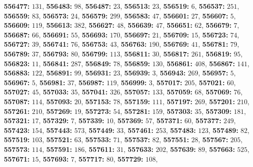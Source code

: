 \textsf{\bfseries 556477:} $131$, \textsf{\bfseries 556483:} $98$, \textsf{\bfseries 556487:} $23$, \textsf{\bfseries 556513:} $23$, \textsf{\bfseries 556519:} $6$, \textsf{\bfseries 556537:} $251$, \textsf{\bfseries 556559:} $83$, \textsf{\bfseries 556573:} $24$, \textsf{\bfseries 556579:} $299$, \textsf{\bfseries 556583:} $47$, \textsf{\bfseries 556601:} $27$, \textsf{\bfseries 556607:} $5$, \textsf{\bfseries 556609:} $119$, \textsf{\bfseries 556613:} $382$, \textsf{\bfseries 556627:} $48$, \textsf{\bfseries 556639:} $47$, \textsf{\bfseries 556651:} $62$, \textsf{\bfseries 556679:} $7$, \textsf{\bfseries 556687:} $66$, \textsf{\bfseries 556691:} $55$, \textsf{\bfseries 556693:} $170$, \textsf{\bfseries 556697:} $21$, \textsf{\bfseries 556709:} $15$, \textsf{\bfseries 556723:} $74$, \textsf{\bfseries 556727:} $39$, \textsf{\bfseries 556741:} $76$, \textsf{\bfseries 556753:} $43$, \textsf{\bfseries 556763:} $190$, \textsf{\bfseries 556769:} $41$, \textsf{\bfseries 556781:} $79$, \textsf{\bfseries 556789:} $37$, \textsf{\bfseries 556793:} $80$, \textsf{\bfseries 556799:} $113$, \textsf{\bfseries 556811:} $30$, \textsf{\bfseries 556817:} $261$, \textsf{\bfseries 556819:} $95$, \textsf{\bfseries 556823:} $11$, \textsf{\bfseries 556841:} $287$, \textsf{\bfseries 556849:} $78$, \textsf{\bfseries 556859:} $130$, \textsf{\bfseries 556861:} $408$, \textsf{\bfseries 556867:} $141$, \textsf{\bfseries 556883:} $122$, \textsf{\bfseries 556891:} $99$, \textsf{\bfseries 556931:} $23$, \textsf{\bfseries 556939:} $3$, \textsf{\bfseries 556943:} $269$, \textsf{\bfseries 556957:} $5$, \textsf{\bfseries 556967:} $5$, \textsf{\bfseries 556981:} $37$, \textsf{\bfseries 556987:} $119$, \textsf{\bfseries 556999:} $3$, \textsf{\bfseries 557017:} $205$, \textsf{\bfseries 557021:} $60$, \textsf{\bfseries 557027:} $45$, \textsf{\bfseries 557033:} $35$, \textsf{\bfseries 557041:} $326$, \textsf{\bfseries 557057:} $133$, \textsf{\bfseries 557059:} $68$, \textsf{\bfseries 557069:} $76$, \textsf{\bfseries 557087:} $114$, \textsf{\bfseries 557093:} $20$, \textsf{\bfseries 557153:} $78$, \textsf{\bfseries 557159:} $111$, \textsf{\bfseries 557197:} $269$, \textsf{\bfseries 557201:} $210$, \textsf{\bfseries 557261:} $210$, \textsf{\bfseries 557269:} $19$, \textsf{\bfseries 557273:} $54$, \textsf{\bfseries 557281:} $159$, \textsf{\bfseries 557303:} $35$, \textsf{\bfseries 557309:} $181$, \textsf{\bfseries 557321:} $17$, \textsf{\bfseries 557329:} $7$, \textsf{\bfseries 557339:} $10$, \textsf{\bfseries 557369:} $57$, \textsf{\bfseries 557371:} $60$, \textsf{\bfseries 557377:} $249$, \textsf{\bfseries 557423:} $154$, \textsf{\bfseries 557443:} $573$, \textsf{\bfseries 557449:} $33$, \textsf{\bfseries 557461:} $253$, \textsf{\bfseries 557483:} $123$, \textsf{\bfseries 557489:} $82$, \textsf{\bfseries 557519:} $103$, \textsf{\bfseries 557521:} $63$, \textsf{\bfseries 557533:} $71$, \textsf{\bfseries 557537:} $82$, \textsf{\bfseries 557551:} $28$, \textsf{\bfseries 557567:} $205$, \textsf{\bfseries 557573:} $114$, \textsf{\bfseries 557591:} $186$, \textsf{\bfseries 557611:} $31$, \textsf{\bfseries 557633:} $202$, \textsf{\bfseries 557639:} $89$, \textsf{\bfseries 557663:} $525$, \textsf{\bfseries 557671:} $15$, \textsf{\bfseries 557693:} $7$, \textsf{\bfseries 557717:} $80$, \textsf{\bfseries 557729:} $108$, 

